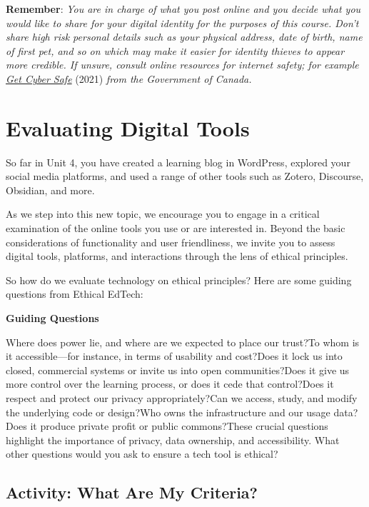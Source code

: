 \documentclass[
  letterpaper,
  DIV=11,
  numbers=noendperiod]{scrreprt}
\begin{document}
\begin{tcolorbox}
\textbf{Remember}: \emph{You are in charge of what you post online and
you decide what you would like to share for your digital identity for
the purposes of this course. Don't share high risk personal details such
as your physical address, date of birth, name of first pet, and so on
which may make it easier for identity thieves to appear more credible.
If unsure, consult online resources for internet safety; for example
\href{https://www.getcybersafe.gc.ca/en/secure-your-accounts/social-media}{Get
Cyber Safe} }(2021) \emph{from the Government of Canada.}

\end{tcolorbox}

\section{Evaluating Digital Tools}\label{evaluating-digital-tools}

So far in Unit 4, you have created a learning blog in WordPress,
explored your social media platforms, and used a range of other tools
such as Zotero, Discourse, Obsidian, and more.

As we step into this new topic, we encourage you to engage in a critical
examination of the online tools you use or are interested in. Beyond the
basic considerations of functionality and user friendliness, we invite
you to assess digital tools, platforms, and interactions through the
lens of ethical principles.

So how do we evaluate technology on ethical principles? Here are some
guiding questions from Ethical EdTech:

\textbf{Guiding Questions}

Where does power lie, and where are we expected to place our trust?To
whom is it accessible---for instance, in terms of usability and
cost?Does it lock us into closed, commercial systems or invite us into
open communities?Does it give us more control over the learning process,
or does it cede that control?Does it respect and protect our privacy
appropriately?Can we access, study, and modify the underlying code or
design?Who owns the infrastructure and our usage data? Does it produce
private profit or public commons?These crucial questions highlight the
importance of privacy, data ownership, and accessibility. What other
questions would you ask to ensure a tech tool is ethical?

\subsection{Activity: What Are My
Criteria?}\label{activity-what-are-my-criteria}
\end{document}
